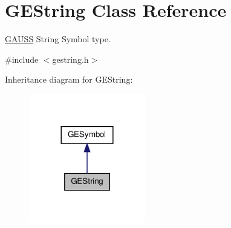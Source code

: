 \hypertarget{class_g_e_string}{\section{G\-E\-String Class Reference}
\label{class_g_e_string}
}


\hyperlink{class_g_a_u_s_s}{G\-A\-U\-S\-S} String Symbol type.  




{\ttfamily \#include $<$gestring.\-h$>$}



Inheritance diagram for G\-E\-String\-:
\nopagebreak
\begin{figure}[H]
\begin{center}
\leavevmode
\includegraphics[width=144pt]{class_g_e_string__inherit__graph}
\end{center}
\end{figure}
